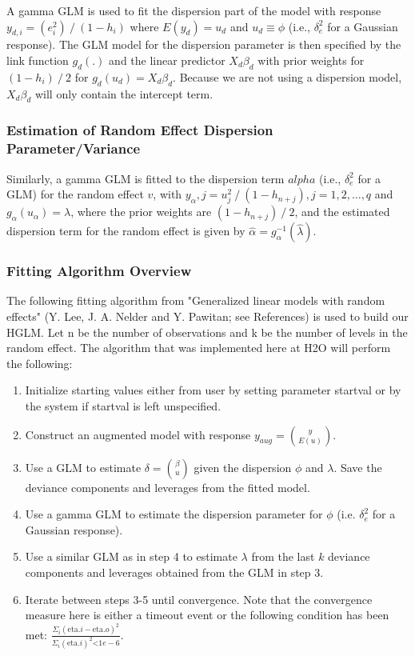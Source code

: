 A gamma GLM is used to fit the dispersion part of the model with response $y_{d,i}=(e_i^2)⁄(1-h_i )$ where $E(y_d )=u_d$ and $u_d\equiv \phi$ (i.e., $\delta_e^2$ for a Gaussian response). The GLM model for the dispersion parameter is then specified by the link function $g_d (.)$ and the linear predictor $X_d \beta_d$ with prior weights for $(1-h_i )⁄2$ for $g_d (u_d )=X_d \beta_d$. Because we are not using a dispersion model, $X_d \beta_d$ will only contain the intercept term.

\subsubsection{Estimation of Random Effect Dispersion Parameter/Variance}

Similarly, a gamma GLM is fitted to the dispersion term $alpha$ (i.e., $\delta_e^2$ for a GLM) for the random effect $v$, with $y_\alpha,j = u_j^2⁄(1-h_{n+j}), j=1,2,\ldots ,q$ and $g_\alpha (u_\alpha )=\lambda$, where the prior weights are $(1-h_{n+j} )⁄2$, and the estimated dispersion term for the random effect is given by $\hat \alpha = g_\alpha ^{-1}(\hat \lambda)$.

\subsubsection{Fitting Algorithm Overview}

The following fitting algorithm from "Generalized linear models with random effects" (Y. Lee, J. A. Nelder and Y. Pawitan; see References) is used to build our HGLM. Let n be the number of observations and k be the number of levels in the random effect. The algorithm that was implemented here at H2O will perform the following:

\begin{enumerate}
    \item Initialize starting values either from user by setting parameter startval or by the system if startval is left unspecified.
    \item Construct an augmented model with response $y_{aug}= {y \choose {E(u)}}$.
    \item Use a GLM to estimate $\delta={\beta \choose u}$ given the dispersion $\phi$ and $\lambda$. Save the deviance components and leverages from the fitted model.
    \item Use a gamma GLM to estimate the dispersion parameter for $\phi$ (i.e. $\delta_e^2$ for a Gaussian response).
    \item Use a similar GLM as in step 4 to estimate $\lambda$ from the last $k$ deviance components and leverages obtained from the GLM in step 3.
    \item Iterate between steps 3-5 until convergence. Note that the convergence measure here is either a timeout event or the following condition has been met: $\frac {\Sigma_i{(\text{eta}. i - \text{eta}.o)^2}} {\Sigma_i(\text{eta}.i)^2 \text{<} 1e - 6}$.
\end{enumerate}
    
